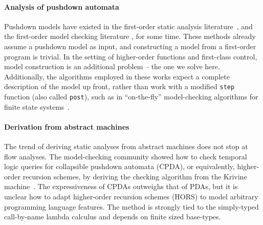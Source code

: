 \paragraph{Analysis of pushdown automata}
Pushdown models have existed in the first-order static analysis literature~\citep[Chapter 7]{local:muchnick:jones:flow-analysis:1981}\citep{ianjohnson:reps:pushdown:1995}, and the first-order model checking literature \citep{ianjohnson:bouajiani:esparza:pushdown:1997}, for some time.
%
These methods already assume a pushdown model as input, and constructing a model from a first-order program is trivial.
%
In the setting of higher-order functions and first-class control, model construction is an additional problem -- the one we solve here.
%
Additionally, the algorithms employed in these works expect a complete description of the model up front, rather than work with a modified \texttt{step} function (also called \texttt{post}), such as in ``on-the-fly'' model-checking algorithms for finite state systems~\citep{DBLP:conf/tacas/SchwoonE05}.

\paragraph{Derivation from abstract machines}
The trend of deriving static analyses from abstract machines does not stop at flow analyses.
%
The model-checking community showed how to check temporal logic queries for collapsible pushdown automata (CPDA), or equivalently, higher-order recursion schemes, by deriving the checking algorithm from the Krivine machine~\citep{ianjohnson:Salvati:2011:KMH:2027223.2027239}.
%
The expressiveness of CPDAs outweighs that of PDAs, but it is unclear how to adapt higher-order recursion schemes (HORS) to model arbitrary programming language features.
%
The method is strongly tied to the simply-typed call-by-name lambda calculus and depends on finite sized base-types.
%

